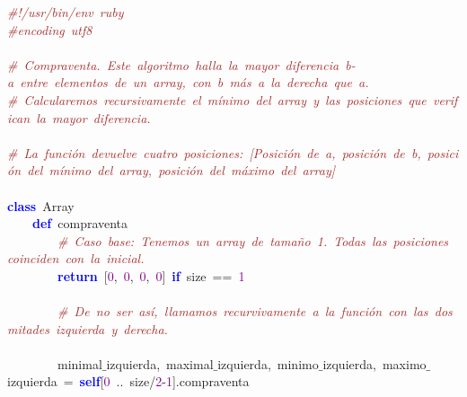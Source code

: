 \noindent
\mbox{}\textit{\textcolor{Brown}{\#!/usr/bin/env\ ruby}} \\
\mbox{}\textit{\textcolor{Brown}{\#encoding\ utf8}} \\
\mbox{} \\
\mbox{}\textit{\textcolor{Brown}{\#\ Compraventa.\ Este\ algoritmo\ halla\ la\ mayor\ diferencia\ b-a\ entre\ elementos\ de\ un\ array,\ con\ b\ más\ a\ la\ derecha\ que\ a.\ }} \\
\mbox{}\textit{\textcolor{Brown}{\#\ Calcularemos\ recursivamente\ el\ mínimo\ del\ array\ y\ las\ posiciones\ que\ verifican\ la\ mayor\ diferencia.\ }} \\
\mbox{} \\
\mbox{}\textit{\textcolor{Brown}{\#\ La\ función\ devuelve\ cuatro\ posiciones:\ [Posición\ de\ a,\ posición\ de\ b,\ posición\ del\ mínimo\ del\ array,\ posición\ del\ máximo\ del\ array]}} \\
\mbox{} \\
\mbox{}\textbf{\textcolor{Blue}{class}}\ Array \\
\mbox{}\ \ \ \ \textbf{\textcolor{Blue}{def}}\ compraventa \\
\mbox{}\ \ \ \ \ \ \ \ \textit{\textcolor{Brown}{\#\ Caso\ base:\ Tenemos\ un\ array\ de\ tamaño\ 1.\ Todas\ las\ posiciones\ coinciden\ con\ la\ inicial.\ }} \\
\mbox{}\ \ \ \ \ \ \ \ \textbf{\textcolor{Blue}{return}}\ \textcolor{BrickRed}{[}\textcolor{Purple}{0}\textcolor{BrickRed}{,}\ \textcolor{Purple}{0}\textcolor{BrickRed}{,}\ \textcolor{Purple}{0}\textcolor{BrickRed}{,}\ \textcolor{Purple}{0}\textcolor{BrickRed}{]}\ \textbf{\textcolor{Blue}{if}}\ size\ \textcolor{BrickRed}{==}\ \textcolor{Purple}{1}\ \ \ \ \ \ \ \ \ \ \ \ \  \\
\mbox{} \\
\mbox{}\ \ \ \ \ \ \ \ \textit{\textcolor{Brown}{\#\ De\ no\ ser\ así,\ llamamos\ recurvivamente\ a\ la\ función\ con\ las\ dos\ mitades\ izquierda\ y\ derecha.\ \ \ \ \ }} \\
\mbox{} \\
\mbox{}\ \ \ \ \ \ \ \ minimal$\_$izquierda\textcolor{BrickRed}{,}\ maximal$\_$izquierda\textcolor{BrickRed}{,}\ minimo$\_$izquierda\textcolor{BrickRed}{,}\ maximo$\_$izquierda\ \textcolor{BrickRed}{=}\ \textbf{\textcolor{Blue}{self}}\textcolor{BrickRed}{[}\textcolor{Purple}{0}\ \textcolor{BrickRed}{..}\ size\textcolor{BrickRed}{/}\textcolor{Purple}{2}\textcolor{BrickRed}{-}\textcolor{Purple}{1}\textcolor{BrickRed}{].}compraventa\  \\
